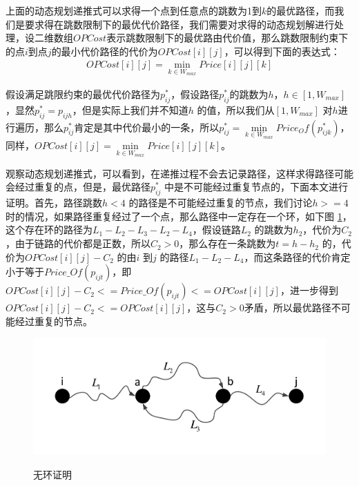 上面的动态规划递推式可以求得一个点到任意点的跳数为1到$k$的最优路径，而我们是要求得在跳数限制下的最优代价路径，我们需要对求得的动态规划解进行处理，设二维数组$OPCost$表示跳数限制下的最优路由代价值，那么跳数限制约束下的点$i$到点$j$的最小代价路径的代价为$OPCost[i][j]$，可以得到下面的表达式：
\begin{equation}\label{best}
\begin{split}
OPCost[i][j]=\min\limits_{k \in W_{max}}{Price[i][j][k]}
\end{split}
\end{equation}

假设满足跳限约束的最优代价路径为$p_{ij}^*$，假设路径$p_{ij}^*$的跳数为$h$，$h \in [1,W_{max}]$，显然$p_{ij}^*=p_{ijh}$，但是实际上我们并不知道$h$ 的值，所以我们从$[1,W_{max}]$ 对$h$进行遍历，那么$p_{ij}^*$肯定是其中代价最小的一条，所以$p_{ij}^*=\min\limits_{k \in W_{max}}{Price_Of(p_{ijk}^*)}$，同样，$OPCost[i][j]=\min\limits_{k \in W_{max}}{Price[i][j][k]}$。

观察动态规划递推式，可以看到，在递推过程不会去记录路径，这样求得路径可能会经过重复的点，但是，最优路径$p_{ij}^*$ 中是不可能经过重复节点的，下面本文进行证明。首先，路径跳数$h<4$ 的路径是不可能经过重复的节点，我们讨论$h>=4$时的情况，如果路径重复经过了一个点，那么路径中一定存在一个环，如下图 \ref{prof}，这个存在环的路径为$L_1-L_2-L_3-L_2-L_4$，假设链路$L_2$ 的跳数为$h_2$，代价为$C_2$，由于链路的代价都是正数，所以$C_2>0$，那么存在一条跳数为$t=h-h_2$ 的，代价为$OPCost[i][j]-C_2$ 的由$i$ 到$j$ 的路径$L_1-L_2-L_4$，而这条路径的代价肯定小于等于$Price\_Of(p_{ijt})$，即$OPCost[i][j]-C_2<=Price\_Of(p_{ijt})<=OPCost[i][j]$，进一步得到$OPCost[i][j]-C_2<=OPCost[i][j]$，这与$C_2>0$矛盾，所以最优路径不可能经过重复的节点。
\begin{figure}
\setlength{\belowcaptionskip}{-0.5cm}
\begin{center}
{\includegraphics[width=1 \textwidth]{figures/circle.pdf}}
\end{center}
\caption{{\footnotesize{无环证明}}}
\label{prof}
\end{figure}
